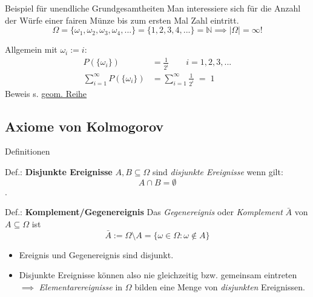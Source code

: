 \documentclass[
  10pt,
  ignorenonframetext,
]{beamer}
\providecommand{\tightlist}{%
  \setlength{\itemsep}{0pt}\setlength{\parskip}{0pt}}
\begin{document}
\begin{frame}{Beispiel für unendliche Grundgesamtheiten}
\label{beispiel-fuxfcr-unendliche-grundgesamtheiten}
Man interessiere sich für die Anzahl der Würfe einer fairen Münze bis
zum ersten Mal Zahl eintritt.
\[\Omega = \{\omega_1, \omega_2,\omega_3, \omega_4, ...  \} = \{1, 2, 3, 4, ...\} = \mathbb{N} \implies |\Omega| = \infty!\]

Allgemein mit \(\omega_i := {i}\): \begin{align*}
P(\{\omega_i\}) &= \frac{1}{2^i} \qquad i = 1, 2, 3, ...\\
\sum\limits_{i=1}^{\infty} P(\{\omega_i\}) & =  \sum\limits_{i=1}^{\infty}  \frac{1}{2^i}   \; = \;  1 \qquad
\end{align*} \footnotesize Beweis s.
\href{https://de.wikipedia.org/wiki/Geometrische_Reihe}{geom. Reihe}
\end{frame}

\subsection{Axiome von Kolmogorov}\label{axiome-von-kolmogorov}

\begin{frame}{Definitionen}
\label{definitionen}
\begin{block}{Def.: \textbf{Disjunkte Ereignisse}}
\label{def.-disjunkte-ereignisse}
\(A,B \subseteq \Omega\) sind \emph{disjunkte Ereignisse} wenn gilt:
\[A \cap B = \emptyset\].
\end{block}

\begin{block}{Def.: \textbf{Komplement/Gegenereignis}}
\label{def.-komplementgegenereignis}
Das \emph{Gegenereignis} oder \emph{Komplement} \(\bar A\) von
\(A \subseteq \Omega\) ist
\[\bar A := \Omega \setminus A = \{\omega \in \Omega: \omega \notin A\}\]
\end{block}

\begin{itemize}
\tightlist
\item
  Ereignis und Gegenereignis sind disjunkt.
\item
  Disjunkte Ereignisse können also nie gleichzeitig bzw. gemeinsam
  eintreten\\
  \(\implies\) \emph{Elementarereignisse} in \(\Omega\) bilden eine
  Menge von \emph{disjunkten} Ereignissen.
\end{itemize}

\end{frame}
\end{document}
